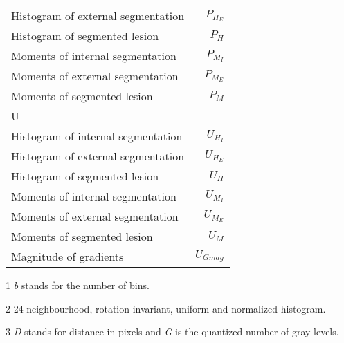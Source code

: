 \begin{table}
\begin{center}
{{\begin{threeparttable}
\begin{tabular}{l r}
	\quad Histogram of external segmentation & $P_{H_{E}}$\\
	\quad Histogram of segmented lesion & $P_{H}$\\
	\quad Moments of internal segmentation & $P_{M_{I}}$\\
	\quad Moments of external segmentation & $P_{M_{E}}$\\
	\quad Moments of segmented lesion & $P_{M}$\\
\multicolumn{2}{l}{U}\\
	\quad Histogram of internal segmentation & $U_{H_{I}}$\\
	\quad Histogram of external segmentation & $U_{H_{E}}$\\
	\quad Histogram of segmented lesion & $U_{H}$\\
	\quad Moments of internal segmentation & $U_{M_{I}}$\\
	\quad Moments of external segmentation & $U_{M_{E}}$\\
	\quad Moments of segmented lesion & $U_{M}$\\
	\quad Magnitude of gradients & $U_{Gmag}$\\
\bottomrule






\end{tabular}
  \scriptsize{
  \begin{tablenotes}
  \item[1] \textit{b} stands for the number of bins.
  \item[2] 24 neighbourhood, rotation invariant, uniform and normalized histogram.
  \item[3] \textit{D} stands for distance in pixels and \textit{G} is the quantized number of gray levels.
  \end{tablenotes}
  }
\end{threeparttable}}}
\end{center}
\label{tab:table2}
\end{table}
